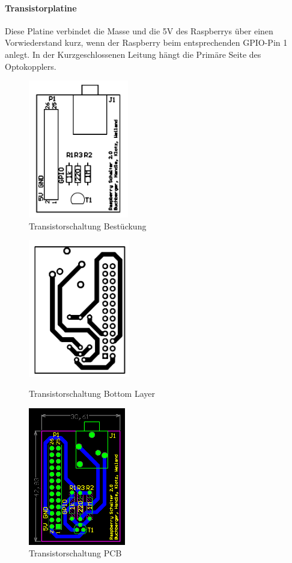 \paragraph{Transistorplatine}
Diese Platine verbindet die Masse und die 5V des Raspberrys über einen Vorwiederstand kurz, wenn der Raspberry beim entsprechenden GPIO-Pin 1 anlegt. In der Kurzgeschlossenen Leitung hängt die Primäre Seite des Optokopplers.\\
\begin{figure}[H]
\centering
\includegraphics[keepaspectratio=true, height=6cm]{images/rpi/Transistorschaltung_Bestueckung.png}
\caption{Transistorschaltung Bestückung}
\label{fig:report_hardware_TransBest}
\end{figure}
\begin{figure}[H]
	\centering
	\begin{minipage}{7cm}
		\centering
		\includegraphics[keepaspectratio=true, height=6cm]{images/rpi/Transistorschaltung_BottomLayer.png}
		\caption{Transistorschaltung Bottom Layer}
		\label{fig:report_hardware_TransBL}
	\end{minipage}
	\hspace{1cm}
	\begin{minipage}{7cm}
		\centering
		\includegraphics[keepaspectratio=true, height=6cm]{images/rpi/Transistorschaltung_PCB.png}
		\caption{Transistorschaltung PCB}
		\label{fig:report_hardware_TransPCB}
	\end{minipage}
\end{figure}
